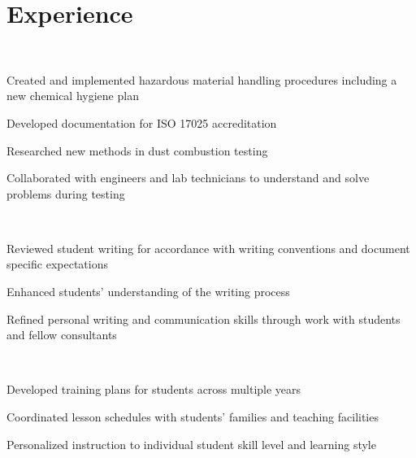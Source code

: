 \documentclass[]{deedy-resume-openfont}
\begin{document}
\begin{minipage}[t]{0.33\textwidth}
%
%

\end{minipage} 
\hfill
\begin{minipage}[t]{0.66\textwidth} 


\section{Experience}

 \\
\vspace{\topsep} %
\begin{tightemize}
	\item Created and implemented hazardous material handling procedures including a new chemical hygiene plan
	\item Developed documentation for ISO 17025 accreditation
	\item Researched new methods in dust combustion testing
	\item Collaborated with engineers and lab technicians to understand and solve problems during testing
\end{tightemize}
\sectionsep

 \\
\begin{tightemize}
	\item Reviewed student writing for accordance with writing conventions and document specific expectations
	\item Enhanced students' understanding of the writing process
	\item Refined personal writing and communication skills through work with students and fellow consultants
\end{tightemize}
\sectionsep

 \\
\begin{tightemize}
	\item Developed training plans for students across multiple years
	\item Coordinated lesson schedules with students' families and teaching facilities
	\item Personalized instruction to individual student skill level and learning style
\end{tightemize}
\sectionsep


\end{minipage}
\end{document}
